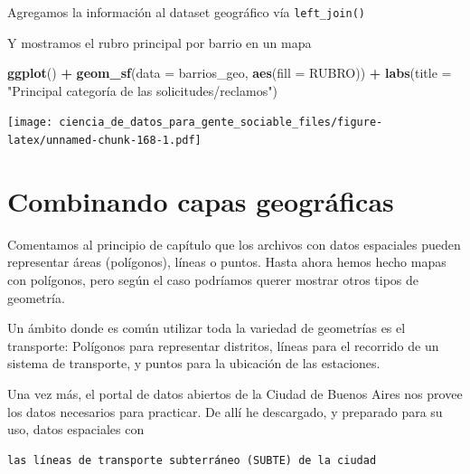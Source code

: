 \documentclass[spanish,]{book}
\newenvironment{Shaded}{\begin{snugshade}}{\end{snugshade}}
\newcommand{\DataTypeTok}[1]{\textcolor[rgb]{0.13,0.29,0.53}{#1}}
\newcommand{\KeywordTok}[1]{\textcolor[rgb]{0.13,0.29,0.53}{\textbf{#1}}}
\newcommand{\NormalTok}[1]{#1}
\newcommand{\OperatorTok}[1]{\textcolor[rgb]{0.81,0.36,0.00}{\textbf{#1}}}
\newcommand{\StringTok}[1]{\textcolor[rgb]{0.31,0.60,0.02}{#1}}
\begin{document}
Agregamos la información al dataset geográfico vía \texttt{left\_join()}

\begin{Shaded}
\end{Shaded}

Y mostramos el rubro principal por barrio en un mapa

\begin{Shaded}
\begin{Highlighting}[]
\KeywordTok{ggplot}\NormalTok{() }\OperatorTok{+}\StringTok{ }
\StringTok{    }\KeywordTok{geom_sf}\NormalTok{(}\DataTypeTok{data =}\NormalTok{ barrios_geo, }\KeywordTok{aes}\NormalTok{(}\DataTypeTok{fill =}\NormalTok{ RUBRO)) }\OperatorTok{+}
\StringTok{    }\KeywordTok{labs}\NormalTok{(}\DataTypeTok{title =} \StringTok{"Principal categoría de las solicitudes/reclamos"}\NormalTok{)}
\end{Highlighting}
\end{Shaded}

\texttt{[image: ciencia\_de\_datos\_para\_gente\_sociable\_files/figure-latex/unnamed-chunk-168-1.pdf]}

\hypertarget{combinando-capas-geogruxe1ficas}{%
\section{Combinando capas geográficas}\label{combinando-capas-geogruxe1ficas}}

Comentamos al principio de capítulo que los archivos con datos espaciales pueden representar áreas (polígonos), líneas o puntos. Hasta ahora hemos hecho mapas con polígonos, pero según el caso podríamos querer mostrar otros tipos de geometría.

Un ámbito donde es común utilizar toda la variedad de geometrías es el transporte: Polígonos para representar distritos, líneas para el recorrido de un sistema de transporte, y puntos para la ubicación de las estaciones.

Una vez más, el portal de datos abiertos de la Ciudad de Buenos Aires nos provee los datos necesarios para practicar. De allí he descargado, y preparado para su uso, datos espaciales con

\begin{verbatim}
las líneas de transporte subterráneo (SUBTE) de la ciudad
\end{verbatim}
\end{document}
